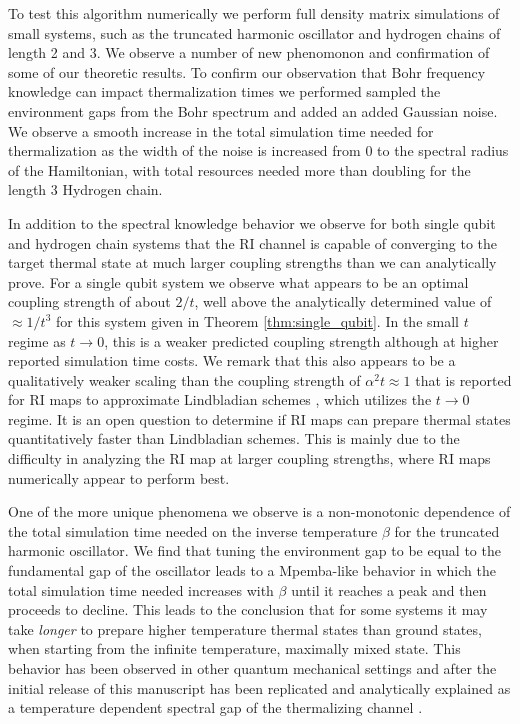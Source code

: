 \documentclass[
 amsmath,amssymb,
 aps,
onecolumn, 
nofootinbib]{revtex4-2}
\begin{document}
To test this algorithm numerically we perform full density matrix simulations of small systems, such as the truncated harmonic oscillator and hydrogen chains of length 2 and 3. We observe a number of new phenomonon and confirmation of some of our theoretic results. To confirm our observation that Bohr frequency knowledge can impact thermalization times we performed sampled the environment gaps from the Bohr spectrum and added an added Gaussian noise. We observe a smooth increase in the total simulation time needed for thermalization as the width of the noise is increased from 0 to the spectral radius of the Hamiltonian, with total resources needed more than doubling for the length 3 Hydrogen chain. 

In addition to the spectral knowledge behavior we observe for both single qubit and hydrogen chain systems that the RI channel is capable of converging to the target thermal state at much larger coupling strengths than we can analytically prove. For a single qubit system we observe what appears to be an optimal coupling strength of about $2/t$, well above the analytically determined value of $\approx 1/ t^3$ for this system given in Theorem \ref{thm:single_qubit}. In the small $t$ regime as $t \to 0$, this is a weaker predicted coupling strength although at higher reported simulation time costs. We remark that this also appears to be a qualitatively weaker scaling than the coupling strength of $\alpha^2 t \approx 1$ that is reported for RI maps to approximate Lindbladian schemes \cite{pocrnic2024quantumsimulationlindbladiandynamics, cleve2016efficient}, which utilizes the $t \to 0$ regime. It is an open question to determine if RI maps can prepare thermal states quantitatively faster than Lindbladian schemes. This is mainly due to the difficulty in analyzing the RI map at larger coupling strengths, where RI maps numerically appear to perform best.

One of the more unique phenomena we observe is a non-monotonic dependence of the total simulation time needed on the inverse temperature $\beta$ for the truncated harmonic oscillator. We find that tuning the environment gap to be equal to the fundamental gap of the oscillator leads to a Mpemba-like \cite{mpemba} behavior in which the total simulation time needed increases with $\beta$ until it reaches a peak and then proceeds to decline. This leads to the conclusion that for some systems it may take \emph{longer} to prepare higher temperature thermal states than ground states, when starting from the infinite temperature, maximally mixed state. This behavior has been observed in other quantum mechanical settings \cite{nickMpemba, zhang2025mpembaObservation, mpembaExplanation} and after the initial release of this manuscript has been replicated and analytically explained as a temperature dependent spectral gap of the thermalizing channel \cite{prositto2025equilibrium, prositto2025mpemba}.
\end{document}
